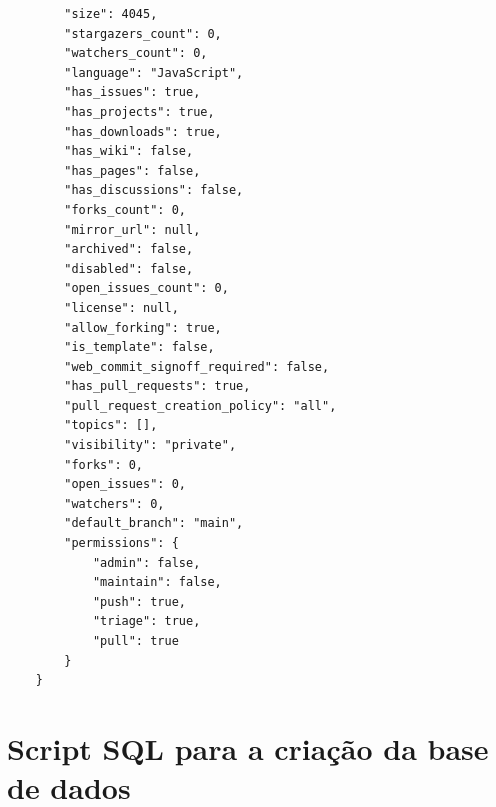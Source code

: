 \begin{lstlisting}
		"size": 4045,
		"stargazers_count": 0,
		"watchers_count": 0,
		"language": "JavaScript",
		"has_issues": true,
		"has_projects": true,
		"has_downloads": true,
		"has_wiki": false,
		"has_pages": false,
		"has_discussions": false,
		"forks_count": 0,
		"mirror_url": null,
		"archived": false,
		"disabled": false,
		"open_issues_count": 0,
		"license": null,
		"allow_forking": true,
		"is_template": false,
		"web_commit_signoff_required": false,
		"has_pull_requests": true,
		"pull_request_creation_policy": "all",
		"topics": [],
		"visibility": "private",
		"forks": 0,
		"open_issues": 0,
		"watchers": 0,
		"default_branch": "main",
		"permissions": {
			"admin": false,
			"maintain": false,
			"push": true,
			"triage": true,
			"pull": true
		}
	}
\end{lstlisting}

\chapter{Script SQL para a criação da base de dados} \label{ap:schema}
